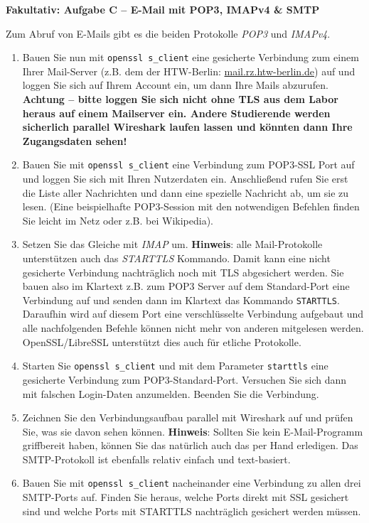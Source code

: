 \documentclass[paper=a4,fontsize=11pt]{scrartcl}%
\numberwithin{equation}{section}
\begin{document}
\begin{center}\Large{\textbf{Fakultativ: Aufgabe C -- E-Mail mit POP3, IMAPv4 \& SMTP}}\end{center}\vskip0.25in
Zum Abruf von E-Mails gibt es die beiden Protokolle \emph{POP3} und \emph{IMAPv4}.
\begin{enumerate}
	\item Bauen Sie nun mit \texttt{openssl s\_client} eine gesicherte Verbindung zum einem Ihrer Mail-Server (z.B. dem der HTW-Berlin: \url{mail.rz.htw-berlin.de}) auf und loggen Sie sich auf Ihrem Account ein, um dann Ihre Mails abzurufen.\\
	{\color{red}\textbf{Achtung -- bitte loggen Sie sich nicht ohne TLS aus dem Labor heraus auf einem Mailserver ein. Andere Studierende werden sicherlich parallel Wireshark  laufen lassen und könnten dann Ihre Zugangsdaten sehen!}}
	\item Bauen Sie mit \texttt{openssl s\_client} eine Verbindung zum POP3-SSL Port auf und loggen Sie sich mit Ihren Nutzerdaten ein. Anschließend rufen Sie erst die Liste aller Nachrichten und dann eine spezielle Nachricht ab, um sie zu lesen. (Eine beispielhafte POP3-Session mit den notwendigen Befehlen finden Sie leicht im Netz oder z.B. bei Wikipedia).
	\item Setzen Sie das Gleiche mit \emph{IMAP} um.
	\textbf{Hinweis}: alle Mail-Protokolle unterstützen auch das \emph{STARTTLS} Kommando. Damit kann eine nicht gesicherte Verbindung nachträglich noch mit TLS abgesichert werden. Sie bauen also im Klartext z.B. zum POP3 Server auf dem Standard-Port eine Verbindung auf und senden dann im Klartext das Kommando \texttt{STARTTLS}. Daraufhin wird auf diesem Port eine verschlüsselte Verbindung aufgebaut und alle nachfolgenden Befehle können nicht mehr von anderen mitgelesen werden. OpenSSL/LibreSSL unterstützt dies auch für etliche Protokolle.
	\item Starten Sie \texttt{openssl s\_client} und mit dem Parameter \texttt{starttls} eine gesicherte Verbindung zum POP3-Standard-Port. Versuchen Sie sich dann mit falschen Login-Daten anzumelden. Beenden Sie die Verbindung.
 	\item Zeichnen Sie den Verbindungsaufbau parallel mit Wireshark auf und prüfen Sie, was sie davon sehen können.
	\textbf{Hinweis}: Sollten Sie kein E-Mail-Programm griffbereit haben, können Sie das natürlich auch das per Hand erledigen. Das SMTP-Protokoll ist ebenfalls relativ einfach und text-basiert.
 	\item Bauen Sie mit \texttt{openssl s\_client} nacheinander eine Verbindung zu allen drei SMTP-Ports auf. Finden Sie heraus, welche Ports direkt mit SSL gesichert sind und welche Ports mit STARTTLS nachträglich gesichert werden müssen.

\end{enumerate}
\end{document}
